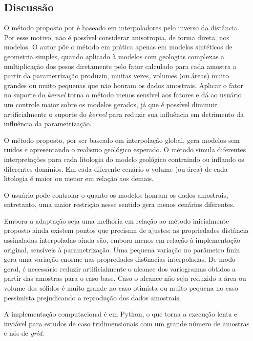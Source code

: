 \subsection{Discussão}

O método proposto por  é baseado em interpoladores pelo inverso da distância. Por esse motivo, não é possível considerar anisotropia, de forma direta, nos modelos. O autor põe o método em prática apenas em modelos sintéticos de geometria simples, quando aplicado à modelos com geologias complexas a multiplicação dos pesos diretamente pelo fator calculado para cada amostra a partir da parametrização produziu, muitas vezes, volumes (ou áreas) muito grandes ou muito pequenas que não honram os dados amostrais. Aplicar o fator no suporte do \textit{kernel} torna o método menos sensível aos fatores e dá ao usuário um controle maior sobre os modelos gerados, já que é possível diminuir artificialmente o suporte do \textit{kernel} para reduzir sua influência em detrimento da influência da parametrização.

O método proposto, por ser baseado em interpolação global, gera modelos sem ruídos e apresentando o realismo geológico esperado. O método simula diferentes interpretações para cada litologia do modelo geológico contraindo ou inflando os diferentes domínios. Em cada diferente cenário o volume (ou área) de cada litologia é maior ou menor em relação aos demais.

O usuário pode controlar o quanto os modelos honram os dados amostrais, entretanto, uma maior restrição nesse sentido gera menos cenários diferentes.

Embora a adaptação seja uma melhoria em relação ao método inicialmente proposto ainda existem pontos que precisam de ajustes: as propriedades distância assinaladas interpoladas ainda são, embora menos em relação à implementação original, sensíveis à parametrização. Uma pequena variação no parâmetro fmin gera uma variação enorme nas propredades dis6nacias interpoladas. De modo geral, é necessário reduzir artificialmente o alcance dos variogramas obtidos a partir das amostras para o caso base. Caso o alcance não seja reduzido a área ou volume dos sólidos é muito grande no caso otimista ou muito pequena no caso pessimista prejudicando a reprodução dos dados amostrais.

A implementação computacional é em Python, o que torna a execução lenta e inviável para estudos de caso tridimensionais com um grande número de amostras e nós de \textit{grid}.

